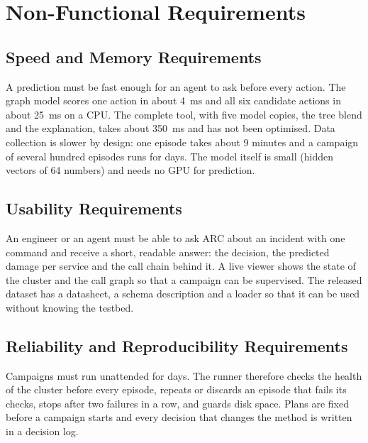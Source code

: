 \documentclass[12pt,a4paper]{report}
\begin{document}
\section{Non-Functional Requirements}
\subsection{Speed and Memory Requirements}
A prediction must be fast enough for an agent to ask before every action. The graph model scores one action in about 4~ms and all six candidate actions in about 25~ms on a CPU. The complete tool, with five model copies, the tree blend and the explanation, takes about 350~ms and has not been optimised. Data collection is slower by design: one episode takes about 9 minutes and a campaign of several hundred episodes runs for days. The model itself is small (hidden vectors of 64 numbers) and needs no GPU for prediction.

\subsection{Usability Requirements}
An engineer or an agent must be able to ask ARC about an incident with one command and receive a short, readable answer: the decision, the predicted damage per service and the call chain behind it. A live viewer shows the state of the cluster and the call graph so that a campaign can be supervised. The released dataset has a datasheet, a schema description and a loader so that it can be used without knowing the testbed.

\subsection{Reliability and Reproducibility Requirements}
Campaigns must run unattended for days. The runner therefore checks the health of the cluster before every episode, repeats or discards an episode that fails its checks, stops after two failures in a row, and guards disk space. Plans are fixed before a campaign starts and every decision that changes the method is written in a decision log.
\end{document}
